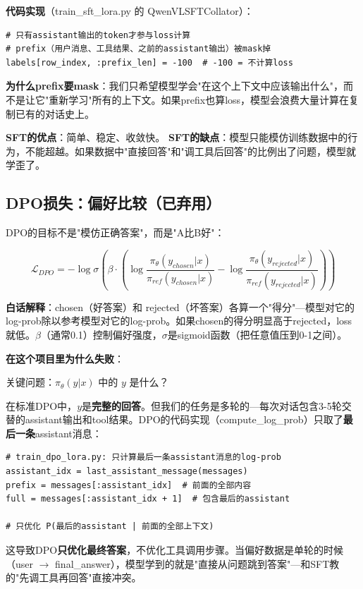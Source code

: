 \documentclass[fontset=none,11pt,a4paper]{ctexart}
\begin{document}
\textbf{代码实现}（train\_sft\_lora.py 的 QwenVLSFTCollator）：
\begin{lstlisting}
# 只有assistant输出的token才参与loss计算
# prefix（用户消息、工具结果、之前的assistant输出）被mask掉
labels[row_index, :prefix_len] = -100  # -100 = 不计算loss
\end{lstlisting}

\textbf{为什么prefix要mask}：我们只希望模型学会"在这个上下文中应该输出什么"，而不是让它"重新学习"所有的上下文。如果prefix也算loss，模型会浪费大量计算在复制已有的对话史上。

\textbf{SFT的优点}：简单、稳定、收敛快。
\textbf{SFT的缺点}：模型只能模仿训练数据中的行为，不能超越。如果数据中"直接回答"和"调工具后回答"的比例出了问题，模型就学歪了。

\subsection{DPO损失：偏好比较（已弃用）}

DPO的目标不是"模仿正确答案"，而是"A比B好"：

\[
\mathcal{L}_{DPO} = -\log\sigma\left(\beta \cdot (\log\frac{\pi_\theta(y_{chosen}|x)}{\pi_{ref}(y_{chosen}|x)} - \log\frac{\pi_\theta(y_{rejected}|x)}{\pi_{ref}(y_{rejected}|x)})\right)
\]

\textbf{白话解释}：chosen（好答案）和 rejected（坏答案）各算一个"得分"---模型对它的log-prob除以参考模型对它的log-prob。如果chosen的得分明显高于rejected，loss就低。$\beta$（通常0.1）控制偏好强度，$\sigma$是sigmoid函数（把任意值压到0-1之间）。

\textbf{在这个项目里为什么失败}：

关键问题：$\pi_\theta(y|x)$ 中的 $y$ 是什么？

在标准DPO中，$y$是\textbf{完整的回答}。但我们的任务是多轮的---每次对话包含3-5轮交替的assistant输出和tool结果。DPO的代码实现（compute\_log\_prob）只取了\textbf{最后一条}assistant消息：

\begin{lstlisting}
# train_dpo_lora.py: 只计算最后一条assistant消息的log-prob
assistant_idx = last_assistant_message(messages)
prefix = messages[:assistant_idx]  # 前面的全部内容
full = messages[:assistant_idx + 1]  # 包含最后的assistant

# 只优化 P(最后的assistant | 前面的全部上下文)
\end{lstlisting}

这导致DPO\textbf{只优化最终答案}，不优化工具调用步骤。当偏好数据是单轮的时候（user $\to$ final\_answer），模型学到的就是"直接从问题跳到答案"---和SFT教的"先调工具再回答"直接冲突。
\end{document}

